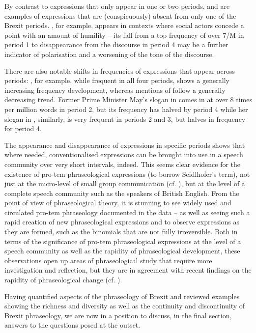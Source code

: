 \documentclass[output=paper]{langscibook}
\begin{document}
By contrast to expressions that only appear in one or two periods,  and  are examples of expressions that are (conspicuously) absent from only one of the Brexit periods. , for example, appears in contexts where social actors concede a point with an amount of humility -- its fall from a top frequency of over 7/M in period 1 to disappearance from the discourse in period 4 may be a further indicator of polarisation and a worsening of the tone of the discourse.

There are also notable shifts in frequencies of expressions that appear across periods: , for example, while frequent in all four periods, shows a generally increasing frequency development, whereas mentions of  follow a generally decreasing trend. Former Prime Minister May’s slogan in  comes in at over 8 times per million words in period 2, but its frequency has halved by period 4 while her slogan in , similarly, is very frequent in periods 2 and 3, but halves in frequency for period 4.

The appearance and disappearance of expressions in specific periods shows that where needed, conventionalised expressions can be brought into use in a speech community over very short intervals, indeed. This seems clear evidence for the existence of pro-tem phraseological expressions (to borrow Seidlhofer’s term), not just at the micro-level of small group communication (cf. \citealt{Seidlhofer2009}), but at the level of a complete speech community such as the speakers of British English. From the point of view of phraseological theory, it is stunning to see widely used and circulated pro-tem phraseology documented in the data -- as well as seeing such a rapid creation of new phraseological expressions and to observe expressions as they are formed, such as the binomials that are not fully irreversible. Both in terms of the significance of pro-tem phraseological expressions at the level of a speech community as well as the rapidity of phraseological development, these observations open up areas of phraseological study that require more investigation and reflection, but they are in agreement with recent findings on the rapidity of phraseological change (cf. \citealt{Buerki2019}).

Having quantified aspects of the phraseology of Brexit and reviewed examples showing the richness and diversity as well as the continuity and discontinuity of Brexit phraseology, we are now in a position to discuss, in the final section, answers to the questions posed at the outset.
\end{document}
